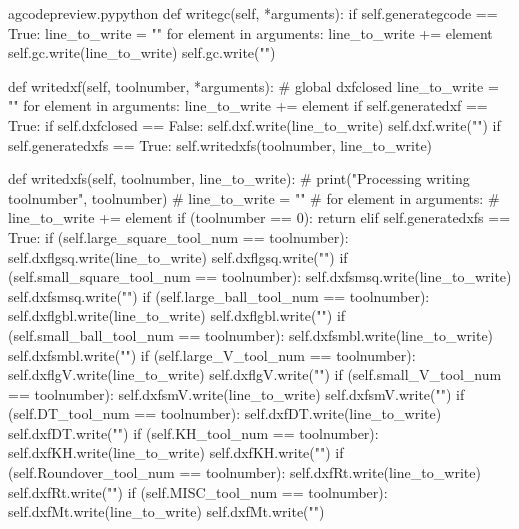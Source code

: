 \documentclass{ltxdoc}
\begin{document}
\lstset{firstnumber=\thegcpy}
\begin{writecode}{a}{gcodepreview.py}{python}
    def writegc(self, *arguments):
        if self.generategcode == True:
            line_to_write = ""
            for element in arguments:
                line_to_write += element
            self.gc.write(line_to_write)
            self.gc.write("\n")

    def writedxf(self, toolnumber, *arguments):
#        global dxfclosed
        line_to_write = ""
        for element in arguments:
            line_to_write += element
        if self.generatedxf == True:
            if self.dxfclosed == False:
                self.dxf.write(line_to_write)
                self.dxf.write("\n")
        if self.generatedxfs == True:
            self.writedxfs(toolnumber, line_to_write)

    def writedxfs(self, toolnumber, line_to_write):
#        print("Processing writing toolnumber", toolnumber)
#        line_to_write = ""
#        for element in arguments:
#            line_to_write += element
        if (toolnumber == 0):
            return
        elif self.generatedxfs == True:
            if (self.large_square_tool_num == toolnumber):
                self.dxflgsq.write(line_to_write)
                self.dxflgsq.write("\n")
            if (self.small_square_tool_num == toolnumber):
                self.dxfsmsq.write(line_to_write)
                self.dxfsmsq.write("\n")
            if (self.large_ball_tool_num == toolnumber):
                self.dxflgbl.write(line_to_write)
                self.dxflgbl.write("\n")
            if (self.small_ball_tool_num == toolnumber):
                self.dxfsmbl.write(line_to_write)
                self.dxfsmbl.write("\n")
            if (self.large_V_tool_num == toolnumber):
                self.dxflgV.write(line_to_write)
                self.dxflgV.write("\n")
            if (self.small_V_tool_num == toolnumber):
                self.dxfsmV.write(line_to_write)
                self.dxfsmV.write("\n")
            if (self.DT_tool_num == toolnumber):
                self.dxfDT.write(line_to_write)
                self.dxfDT.write("\n")
            if (self.KH_tool_num == toolnumber):
                self.dxfKH.write(line_to_write)
                self.dxfKH.write("\n")
            if (self.Roundover_tool_num == toolnumber):
                self.dxfRt.write(line_to_write)
                self.dxfRt.write("\n")
            if (self.MISC_tool_num == toolnumber):
                self.dxfMt.write(line_to_write)
                self.dxfMt.write("\n")

\end{writecode}
\addtocounter{gcpy}{58}
\end{document}
